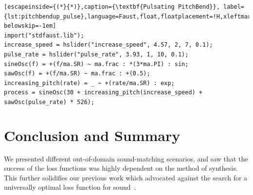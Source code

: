 \documentclass{article} %
\begin{document}
\begin{lstlisting}[escapeinside={(*}{*)},caption={\textbf{Pulsating PitchBend}}, label={lst:pitchbendup_pulse},language=Faust,float,floatplacement=!H,xleftmargin=1em,xrightmargin=0.5em,firstnumber=0,aboveskip=0em, belowskip=-1em]
import("stdfaust.lib");
increase_speed = hslider("increase_speed", 4.57, 2, 7, 0.1);
pulse_rate = hslider("pulse_rate", 3.93, 1, 10, 0.1);
sineOsc(f) = +(f/ma.SR) ~ ma.frac : *(3*ma.PI) : sin;
sawOsc(f) = +(f/ma.SR) ~ ma.frac : +(0.5);
increasing_pitch(rate) = _ ~ +(rate/ma.SR) : exp;
process = sineOsc(30 + increasing_pitch(increase_speed) + sawOsc(pulse_rate) * 526);
\end{lstlisting}


\section{Conclusion and Summary}
We presented different out-of-domain sound-matching scenarios, and saw that the success of the loss functions was highly dependent on the method of synthesis. This further solidifies our previous work which advocated against the search for a universally optimal loss function for sound~\cite{salimi2025soundmatching}.

\clearpage


\end{document}
